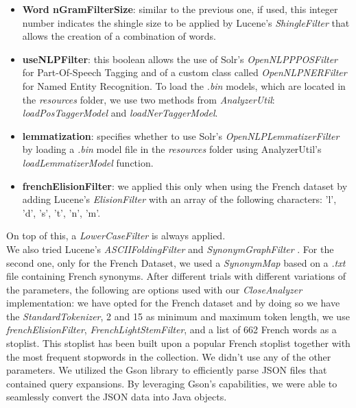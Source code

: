 \begin{itemize}
  \item \textbf{Word nGramFilterSize}: similar to the previous one, if used, this integer number indicates the shingle size to be applied by Lucene's \textit{ShingleFilter} \cite{luceneshinglefilter} that allows the creation of a combination of words.

  \item \textbf{useNLPFilter}: this boolean allows the use of Solr's \cite{solr} \textit{OpenNLPPPOSFilter} \cite{solropennlpposfilter} for Part-Of-Speech Tagging and of a custom class called \textit{OpenNLPNERFilter} for Named Entity Recognition.
  To load the \textit{.bin} models, which are located in the \textit{resources} folder, we use two methods from \textit{AnalyzerUtil}: \textit{loadPosTaggerModel} and \textit{loadNerTaggerModel}.

  \item \textbf{lemmatization}: specifies whether to use Solr's \textit{OpenNLPLemmatizerFilter} \cite{solropennlplemmafilter} by loading a \textit{.bin} model file in the \textit{resources} folder using AnalyzerUtil's \textit{loadLemmatizerModel} function.

  \item \textbf{frenchElisionFilter}: we applied this only when using the French dataset by adding Lucene's \textit{ElisionFilter} \cite{luceneelisionfilter} with an array of the following characters: 'l', 'd', 's', 't', 'n', 'm'.
\end{itemize}
On top of this, a \textit{LowerCaseFilter} \cite{lucenelowercasefilter} is always applied. \\
We also tried Lucene's \textit{ASCIIFoldingFilter} \cite{luceneasciifoldingfilter} and \textit{SynonymGraphFilter} \cite{lucenesynonymgraphfilter}.
For the second one, only for the French Dataset, we used a \textit{SynonymMap} \cite{lucenesynonymmap} based on a \textit{.txt} file containing French synonyms.
\newline
After different trials with different variations of the parameters, the following are options used with our \textit{CloseAnalyzer} implementation: we have opted for the French dataset and by doing so we have the \textit{StandardTokenizer}, 2 and 15 as minimum and maximum token length, we use \textit{frenchElisionFilter}, \textit{FrenchLightStemFilter}, and a list of 662 French words as a stoplist.
This stoplist has been built upon a popular French stoplist together with the most frequent stopwords in the collection.  
We didn't use any of the other parameters.
We utilized the Gson library to efficiently parse JSON files that contained query expansions. By leveraging Gson's capabilities, we were able to seamlessly convert the JSON data into Java objects.


